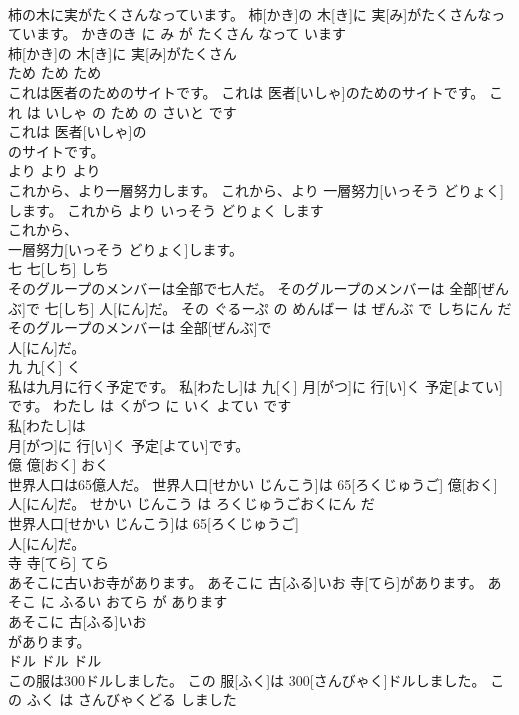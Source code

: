 \documentclass[8pt]{extreport}
\begin{document}
\begin{CJK}{UTF8}{min}
\\	柿の木に実がたくさんなっています。	柿[かき]の 木[き]に 実[み]がたくさんなっています。	かきのき に み が たくさん なって います	
\\	柿[かき]の 木[き]に 実[み]がたくさん
\\	ため	ため	ため	
\\	これは医者のためのサイトです。	これは 医者[いしゃ]のためのサイトです。	これ は いしゃ の ため の さいと です	
\\	これは 医者[いしゃ]の
\\	のサイトです。			
\\	より	より	より	
\\	これから、より一層努力します。	これから、より 一層努力[いっそう どりょく]します。	これから より いっそう どりょく します	
\\	これから、
\\	一層努力[いっそう どりょく]します。			
\\	七	七[しち]	しち	
\\	そのグループのメンバーは全部で七人だ。	そのグループのメンバーは 全部[ぜんぶ]で 七[しち] 人[にん]だ。	その ぐるーぷ の めんばー は ぜんぶ で しちにん だ	
\\	そのグループのメンバーは 全部[ぜんぶ]で
\\	人[にん]だ。			
\\	九	九[く]	く	
\\	私は九月に行く予定です。	私[わたし]は 九[く] 月[がつ]に 行[い]く 予定[よてい]です。	わたし は くがつ に いく よてい です	
\\	私[わたし]は
\\	月[がつ]に 行[い]く 予定[よてい]です。			
\\	億	億[おく]	おく	
\\	世界人口は65億人だ。	世界人口[せかい じんこう]は 65[ろくじゅうご] 億[おく] 人[にん]だ。	せかい じんこう は ろくじゅうごおくにん だ	
\\	世界人口[せかい じんこう]は 65[ろくじゅうご]
\\	人[にん]だ。			
\\	寺	寺[てら]	てら	
\\	あそこに古いお寺があります。	あそこに 古[ふる]いお 寺[てら]があります。	あそこ に ふるい おてら が あります	
\\	あそこに 古[ふる]いお
\\	があります。			
\\	ドル	ドル	ドル	
\\	この服は300ドルしました。	この 服[ふく]は 300[さんびゃく]ドルしました。	この ふく は さんびゃくどる しました	

\end{CJK}
\end{document}

